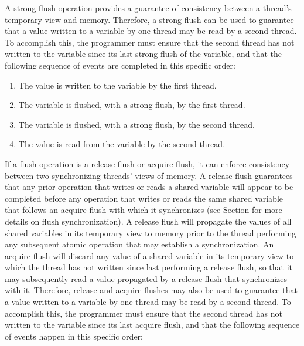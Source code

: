 A strong flush operation provides a guarantee of consistency between a thread’s
temporary view and memory. Therefore, a strong flush can be used to
guarantee that a value written to a variable by one thread may be read by a
second thread. To accomplish this, the programmer must ensure that the second
thread has not written to the variable since its last strong flush of the
variable, and that the following sequence of events are completed in this 
specific order:

\begin{enumerate}
    \item The value is written to the variable by the first thread.
    \item The variable is flushed, with a strong flush, by the first thread.
    \item The variable is flushed, with a strong flush, by the second thread.
    \item The value is read from the variable by the second thread.
\end{enumerate}

If a flush operation is a release flush or acquire flush, it can enforce
consistency between two synchronizing threads' views of memory.  A release
flush guarantees that any prior operation that writes or reads a shared
variable will appear to be completed before any operation that writes or reads
the same shared variable that follows an acquire flush with which it
synchronizes (see Section  for more details on
flush synchronization).  A release flush will propagate the values of all
shared variables in its temporary view to memory prior to the thread
performing any subsequent atomic operation that may establish a
synchronization. An acquire flush will discard any value of a shared variable
in its temporary view to which the thread has not written since last performing
a release flush, so that it may subsequently read a value propagated by a
release flush that synchronizes with it.   Therefore, release and acquire
flushes may also be used to guarantee that a value written to a variable by
one thread may be read by a second thread. To accomplish this, the programmer
must ensure that the second thread has not written to the variable since its
last acquire flush, and that the following sequence of events happen in this
specific order:


